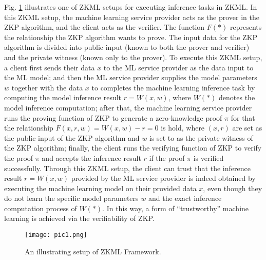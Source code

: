 \documentclass[journal]{IEEEtran}
\begin{document}
Fig. \ref{f1} illustrates one of ZKML setups for executing inference tasks in ZKML. In this ZKML setup, the machine learning service provider acts as the prover in the ZKP algorithm, and the client acts as the verifier. The function \( F(\ast) \) represents the relationship the ZKP algorithm wants to prove. The input data for the ZKP algorithm is divided into public input (known to both the prover and verifier) and the private witness (known only to the prover). To execute this ZKML setup, a client first sends their data \( x \)  to the ML service provider as the data input to the ML model; and then the ML service provider supplies the model parameters $w$ together with the data \( x \) to completes the  machine learning inference task by computing the model inference result \( r = W(x, w) \), where \( W(\ast) \) denotes the model inference computation; after that, the machine learning service provider runs the proving function of ZKP to generate a zero-knowledge proof \( \pi \) for that the relationship \( F(x, r, w) = W(x, w) - r = 0 \) is hold, where \( (x, r) \) are set as the public input of the ZKP algorithm and \( w \) is set to as the private witness of the ZKP algorithm; finally, the client runs the verifying function of ZKP to verify the proof \( \pi \) and accepts the inference result \( r \) if the proof \( \pi \) is verified successfully. Through this ZKML setup, the client can trust that the inference result \( r = W(x, w) \) provided by the ML service provider is indeed obtained by executing the machine learning model on their provided data \( x \), even though they do not learn the specific model parameters \( w \) and the exact inference computation process of \( W(\ast) \). In this way, a form of ``trustworthy'' machine learning is achieved via the verifiability of ZKP.

\begin{figure}[t]
    \centering
    \texttt{[image: pic1.png]}
    \caption{An illustrating setup of ZKML Framework.}
    \label{f1}
\vspace{-10pt}
\end{figure}
\end{document}
